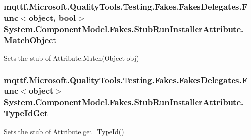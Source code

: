 \hypertarget{class_system_1_1_component_model_1_1_fakes_1_1_stub_run_installer_attribute_a9ad711d600c10679fe5dc93fa7fd933a}{
\subsubsection[{Match\-Object}]{\setlength{\rightskip}{0pt plus 5cm}mqttf.\-Microsoft.\-Quality\-Tools.\-Testing.\-Fakes.\-Fakes\-Delegates.\-Func$<$object, bool$>$ System.\-Component\-Model.\-Fakes.\-Stub\-Run\-Installer\-Attribute.\-Match\-Object}}\label{class_system_1_1_component_model_1_1_fakes_1_1_stub_run_installer_attribute_a9ad711d600c10679fe5dc93fa7fd933a}


Sets the stub of Attribute.\-Match(\-Object obj)

\hypertarget{class_system_1_1_component_model_1_1_fakes_1_1_stub_run_installer_attribute_adc14f47e777ba3cd4c0101c9385cf564}{
\subsubsection[{Type\-Id\-Get}]{\setlength{\rightskip}{0pt plus 5cm}mqttf.\-Microsoft.\-Quality\-Tools.\-Testing.\-Fakes.\-Fakes\-Delegates.\-Func$<$object$>$ System.\-Component\-Model.\-Fakes.\-Stub\-Run\-Installer\-Attribute.\-Type\-Id\-Get}}\label{class_system_1_1_component_model_1_1_fakes_1_1_stub_run_installer_attribute_adc14f47e777ba3cd4c0101c9385cf564}


Sets the stub of Attribute.\-get\-\_\-\-Type\-Id()




